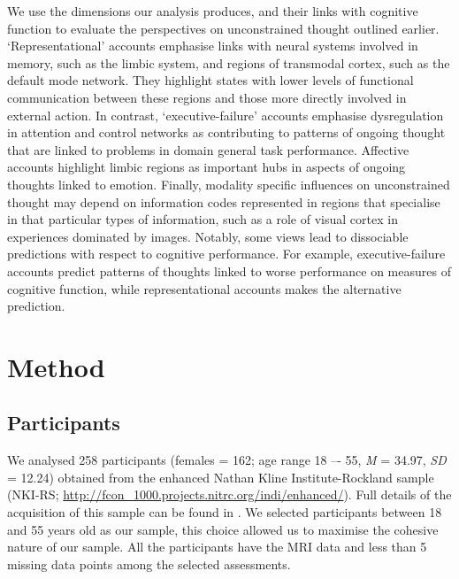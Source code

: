 We use the dimensions our analysis produces, and their links with cognitive function to evaluate the perspectives on unconstrained thought outlined earlier. `Representational' accounts emphasise links with neural systems involved in memory, such as the limbic system, and regions of transmodal cortex, such as the default mode network. They highlight states with lower levels of functional communication between these regions and those more directly involved in external action. In contrast, `executive-failure' accounts emphasise dysregulation in attention and control networks as contributing to patterns of ongoing thought that are linked to problems in domain general task performance. Affective accounts highlight limbic regions as important hubs in aspects of ongoing thoughts linked to emotion. Finally, modality specific influences on unconstrained thought may depend on information codes represented in regions that specialise in that particular types of information, such as a role of visual cortex in experiences dominated by images. Notably, some views lead to dissociable predictions with respect to cognitive performance. For example, executive-failure accounts predict patterns of thoughts linked to worse performance on measures of cognitive function, while representational accounts makes the alternative prediction.

\section{Method}
\label{study2:method}

\subsection{Participants}
\label{study2:method:participants}
We analysed 258 participants (females = 162; age range 18 –- 55, \textit{M} = 34.97, \textit{SD} = 12.24) obtained from the enhanced Nathan Kline Institute-Rockland sample (NKI-RS;  \url{http://fcon_1000.projects.nitrc.org/indi/enhanced/}).
Full details of the acquisition of this sample can be found in .
We selected participants between 18 and 55 years old as our sample, this choice allowed us to maximise the cohesive nature of our sample.  All the participants have the MRI data and less than 5 missing data points among the selected assessments.

